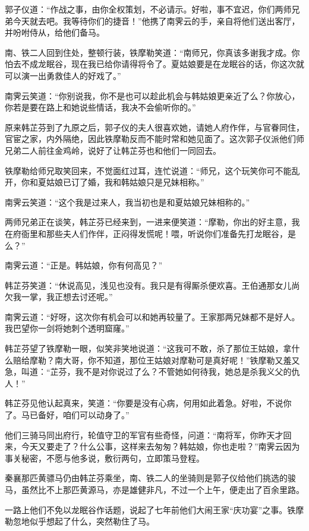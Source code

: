 \documentclass[12pt,oneside]{book}
\begin{document}
郭子仪道：``作战之事，由你全权策划，不必请示。好啦，事不宜迟，你们两师兄弟今天就去吧。我等待你们的捷音！''他携了南霁云的手，亲自将他们送出客厅，并吩咐侍从，给他们备马。

南、铁二人回到住处，整顿行装，铁摩勒笑道：``南师兄，你真该多谢我才成。你怕去不成龙眠谷，现在我已给你请得将令了。夏姑娘要是在龙眠谷的话，你这次就可以演一出勇救佳人的好戏了。''

南霁云笑道：``你别说我，你不是也可以趁此机会与韩姑娘更亲近了么？你放心，你若是要在路上和她说些情话，我决不会偷听你的。''

原来韩芷芬到了九原之后，郭子仪的夫人很喜欢她，请她人府作伴，与官眷同住，官宦之家，内外隔绝，因此铁摩勒反而不能时常和她见面了。这次郭子仪派他们师兄弟二人前往金鸡岭，说好了让韩芷芬也和他们一同回去。

铁摩勒给师兄取笑回来，不觉面红过耳，连忙说道：``师兄，这个玩笑你可不能乱开，你和夏姑娘已订了婚，我和韩姑娘只是兄妹相称。''

南霁云笑道：``这个我是过来人，我当初也是和夏姑娘兄妹相称的。''

两师兄弟正在谈笑，韩芷芬已经来到，一进来便笑道：``摩勒，你出的好主意，我在府衙里和那些夫人们作伴，正闷得发慌呢！喂，听说你们准备先打龙眠谷，是么？''

南霁云道：``正是。韩姑娘，你有何高见？''

韩芷芬笑道：``休说高见，浅见也没有。我只是有得厮杀便欢喜。王伯通那女儿尚欠我一掌，我正想去讨还呢。''

南霁云道：``好呀，这次你有机会可以和她再较量了。王家那两兄妹都不是好人。我巴望你一剑将她刺个透明窟窿。''

韩芷芬望了铁摩勒一眼，似笑非笑地说道：``这我可不敢，杀了那位王姑娘，拿什么赔给摩勒？南大哥，你不知道，那位王姑娘对摩勒可是真好呢！''铁摩勒又羞又急，叫道：``芷芬，我不是对你说过了么？不管她如何待我，她总是杀我义父的仇人！''

韩芷芬见他认起真来，笑道：``你要是没有心病，何用如此着急。好啦，不说你了。马已备好，咱们可以动身了。''

他们三骑马同出府行，轮值守卫的军官有些奇怪，问道：``南将军，你昨天才回来，今天又要走了？什么公事，这样来去匆匆？韩姑娘，你也走啦？''南霁云因为事关秘密，不愿与他多说，敷衍两句，立即策马登程。

秦襄那匹黄骠马仍由韩芷芬乘坐，南、铁二人的坐骑则是郭子仪给他们挑选的骏马，虽然比不上那匹黄源马，亦是雄健非凡，不过一个上午，便走出了百余里路。

一路上他们不免以龙眠谷作话题，说起了七年前他们大闹王家``庆功宴''之事。铁摩勒忽地似乎想起了什么，突然勒住了马。
\end{document}
